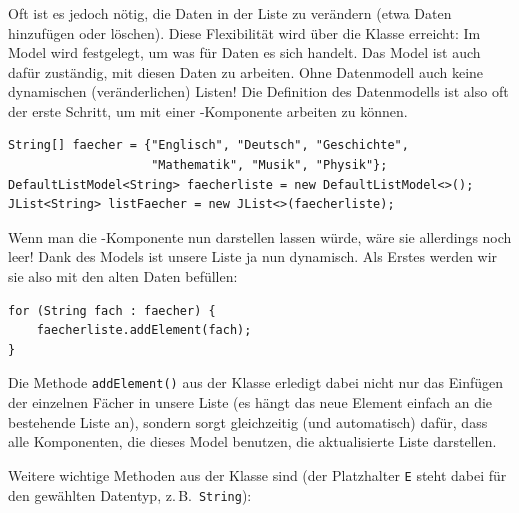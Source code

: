 \subsubsection{}

Oft ist es jedoch nötig, die Daten in der Liste zu verändern (etwa Daten
hinzufügen oder löschen). Diese Flexibilität wird über die Klasse
 erreicht: Im Model wird festgelegt, um was für Daten
es sich handelt. Das Model ist auch dafür zuständig, mit diesen Daten zu
arbeiten. Ohne Datenmodell auch keine dynamischen (veränderlichen) Listen! Die
Definition des Datenmodells ist also oft der erste Schritt, um mit einer
-Komponente arbeiten zu können.

\begin{lstlisting}
String[] faecher = {"Englisch", "Deutsch", "Geschichte", 
                    "Mathematik", "Musik", "Physik"};
DefaultListModel<String> faecherliste = new DefaultListModel<>();
JList<String> listFaecher = new JList<>(faecherliste);
\end{lstlisting}

Wenn man die -Komponente nun darstellen lassen würde, wäre sie
allerdings noch leer! Dank des Models ist unsere Liste ja nun dynamisch. Als
Erstes werden wir sie also mit den alten Daten befüllen:

\begin{lstlisting}
for (String fach : faecher) {
    faecherliste.addElement(fach);
}
\end{lstlisting}

Die Methode \lstinline|addElement()| aus der Klasse 
erledigt dabei nicht nur das Einfügen der einzelnen Fächer in unsere Liste (es
hängt das neue Element einfach an die bestehende Liste an), sondern sorgt
gleichzeitig (und automatisch) dafür, dass alle Komponenten, die dieses Model
benutzen, die aktualisierte Liste darstellen.

Weitere wichtige Methoden aus der Klasse  sind (der
Platzhalter \texttt{E} steht dabei für den gewählten Datentyp, z.\,B.\
\texttt{String}):

